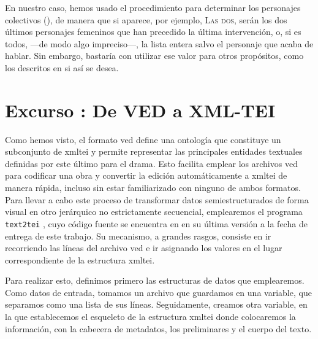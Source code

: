 En nuestro caso, hemos usado el procedimiento para determinar los personajes colectivos (), de manera que si aparece, por ejemplo, \textsc{Las dos}, serán los dos últimos personajes femeninos que han precedido la última intervención, o, si es todos, —de modo algo impreciso—, la lista entera salvo el personaje que acaba de hablar. Sin embargo, bastaría con utilizar ese valor para otros propósitos, como los descritos en  si así se desea. 

\section{Excurso : De VED a XML-TEI}
Como hemos visto, el formato \ac{ved} define una ontología que constituye un subconjunto de \ac{xmltei} y permite representar las principales entidades textuales definidas por este último para el drama. Esto facilita emplear los archivos \ac{ved} para codificar una obra y convertir la edición automáticamente a \ac{xmltei} de manera rápida, incluso sin estar familiarizado con ninguno de ambos formatos. Para llevar a cabo este proceso de transformar datos semiestructurados de forma visual en otro jerárquico no estrictamente secuencial, emplearemos el programa \texttt{text2tei} \parencite{sanz2022sc}, cuyo código fuente se encuentra en  en su última versión a la fecha de entrega de este trabajo. Su mecanismo, a grandes rasgos, consiste en ir recorriendo las líneas del archivo \ac{ved} e ir asignando los valores en el lugar correspondiente de la estructura \ac{xmltei}.

Para realizar esto, definimos primero las estructuras de datos que emplearemos. Como datos de entrada, tomamos un archivo que guardamos en una variable, que separamos como una lista de sus líneas. Seguidamente, creamos otra variable, en la que establecemos el esqueleto de la estructura \ac{xmltei} donde colocaremos la información, con la cabecera de metadatos, los preliminares y el cuerpo del texto.

